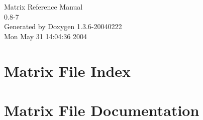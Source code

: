 \documentclass[letterpaper]{article}
\begin{document}
\begin{titlepage}
\vspace*{7cm}
\begin{center}
{\Large Matrix Reference Manual\\[1ex]\large 0.8-7 }\\
\vspace*{1cm}
{\large Generated by Doxygen 1.3.6-20040222}\\
\vspace*{0.5cm}
{\small Mon May 31 14:04:36 2004}\\
\end{center}
\end{titlepage}
\tableofcontents
{}
\section{Matrix File Index}

\section{Matrix File Documentation}
















































\printindex
\end{document}
